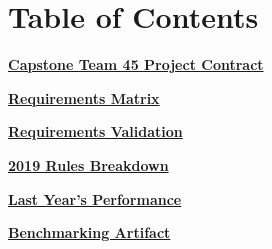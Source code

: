 \documentclass[]{article}
\newcounter{includepdfpage}
\begin{document}



\section{Table of Contents}

\hyperlink{proj_con.1}{\textbf{Capstone Team 45 Project Contract}}

\hyperlink{req_mat.1}{\textbf{Requirements Matrix}}

\hyperlink{req_val.1}{\textbf{Requirements Validation}}

\hyperlink{rule_brk.1}{\textbf{2019 Rules Breakdown}}

\hyperlink{last_yr.1}{\textbf{Last Year's Performance}}

\hyperlink{bench.1}{\textbf{Benchmarking Artifact}}












\end{document}
